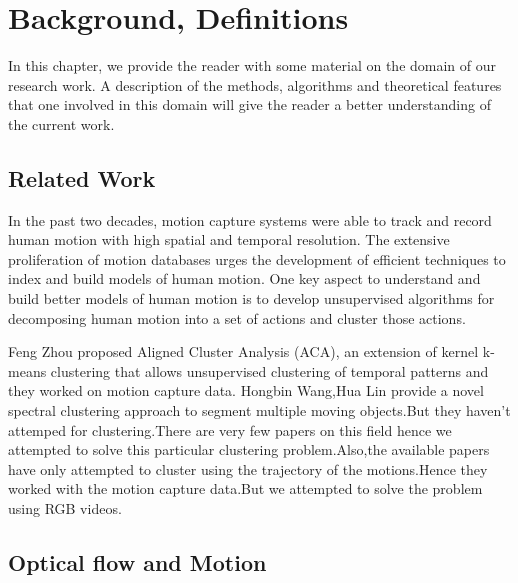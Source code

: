 
\chapter{Background, Definitions} %

\label{Chapter2} %


In  this  chapter,  we  provide  the  reader  with  some  material  on  the domain  of  our research  work.  A  description  of  the  methods,  algorithms  and  theoretical  features that one involved in this domain will give the reader a better understanding  of the current work. 

\section{Related Work}
In the past two decades, motion capture systems were able to track and record human motion with high spatial and temporal resolution.
The extensive proliferation of motion databases urges the development of efficient techniques to index and build models of human motion. One key aspect to understand and build better models of human motion is to develop unsupervised algorithms for decomposing human motion into a set of actions and cluster those actions.

Feng Zhou\cite{Aligned} proposed Aligned Cluster Analysis (ACA), an extension of kernel k-means clustering that allows unsupervised clustering of temporal patterns and they worked on motion capture data. Hongbin Wang,Hua Lin\cite{Spectral} provide a novel spectral clustering approach to segment multiple moving objects.But they haven't attemped for clustering.There are very few papers on this field hence we attempted to solve this particular clustering problem.Also,the available papers have only attempted to cluster using the trajectory of the motions.Hence they worked with the motion capture data.But we attempted to solve the problem using RGB videos.   



\section{Optical flow and Motion}

